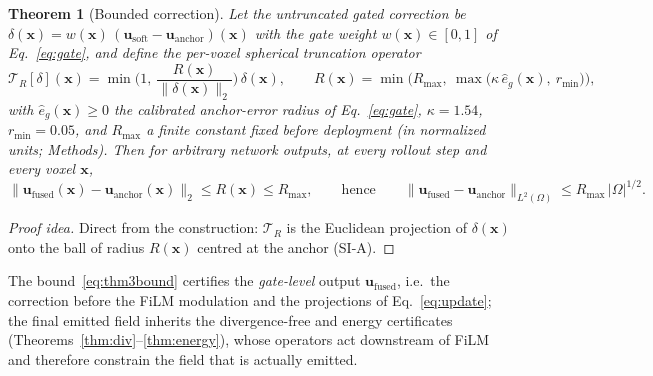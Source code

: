 \documentclass[11pt,a4paper]{article}
\newtheorem{theorem}{Theorem}
\newcommand{\bu}{\bm{u}}
\newcommand{\cT}{\mathcal{T}}
\begin{document}
\begin{theorem}[Bounded correction]\label{thm:gate}
Let the untruncated gated correction be $\delta(\bm{x})=w(\bm{x})\,(\bu_{\mathrm{soft}}-\bu_{\mathrm{anchor}})(\bm{x})$ with the gate weight $w(\bm{x})\in[0,1]$ of Eq.~\eqref{eq:gate}, and define the per-voxel spherical truncation operator
\begin{equation}
\cT_R[\delta](\bm{x})=\min\!\Big(1,\ \frac{R(\bm{x})}{\|\delta(\bm{x})\|_2}\Big)\,\delta(\bm{x}),\qquad
R(\bm{x})=\min\!\Big(R_{\max},\ \max\big(\kappa\,\hat e_g(\bm{x}),\ r_{\min}\big)\Big),
\label{eq:trunc}
\end{equation}
with $\hat e_g(\bm{x})\ge0$ the calibrated anchor-error radius of Eq.~\eqref{eq:gate}, $\kappa=1.54$, $r_{\min}=0.05$, and $R_{\max}$ a finite constant fixed before deployment (in normalized units; Methods). Then for \emph{arbitrary} network outputs, at every rollout step and every voxel $\bm{x}$,
\begin{equation}
\big\|\bu_{\mathrm{fused}}(\bm{x})-\bu_{\mathrm{anchor}}(\bm{x})\big\|_2\le R(\bm{x})\le R_{\max},
\qquad\text{hence}\qquad
\big\|\bu_{\mathrm{fused}}-\bu_{\mathrm{anchor}}\big\|_{L^2(\Omega)}\le R_{\max}\,|\Omega|^{1/2}.
\label{eq:thm3bound}
\end{equation}
\end{theorem}
\begin{proof}[Proof idea]
Direct from the construction: $\cT_R$ is the Euclidean projection of $\delta(\bm{x})$ onto the ball of radius $R(\bm{x})$ centred at the anchor (SI-A).
\end{proof}
The bound~\eqref{eq:thm3bound} certifies the \emph{gate-level} output $\bu_{\mathrm{fused}}$, i.e.\ the correction before the FiLM modulation and the projections of Eq.~\eqref{eq:update}; the final emitted field inherits the divergence-free and energy certificates (Theorems~\ref{thm:div}--\ref{thm:energy}), whose operators act downstream of FiLM and therefore constrain the field that is actually emitted.
\end{document}
